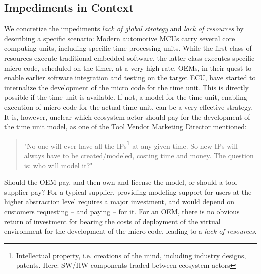 \subsection{Impediments in Context}
We concretize the impediments 
\emph{lack of global strategy} and \emph{lack of resources}
by describing a specific scenario:
Modern automotive MCUs carry several core computing units, including specific time processing units.
While the first class of resources execute traditional embedded software, the latter class executes specific micro code, scheduled on the timer, at a very high rate.
OEMs, in their quest to enable earlier software integration and testing on the target ECU, have started to internalize the development of the micro code for the time unit.
This is directly possible if the time unit is available.
If not, a model for the time unit, enabling execution of micro code for the actual time unit, can be a very effective strategy.
It is, however, unclear which ecosystem actor should pay for the development of the time unit model, as one of the Tool Vendor Marketing Director mentioned: 

\begin{quote}
"No one will ever have all the IPs\footnote{Intellectual property, i.e. creations of the mind, including industry designs, patents. Here: SW/HW components traded between ecosystem actors} at any given time. So new IPs will always have to be created/modeled, costing time and money. The question is: who will model it?"
\end{quote}

Should the OEM pay, and then own and license the model, or should a tool supplier pay?
For a typical supplier, providing modeling support for users at the higher  abstraction level requires a major investment, and would depend on customers requesting -- and paying -- for it.
For an OEM, there is no obvious return of investment for bearing the costs of deployment of the virtual environment for the development of the micro code, leading to a \emph{lack of resources}.


